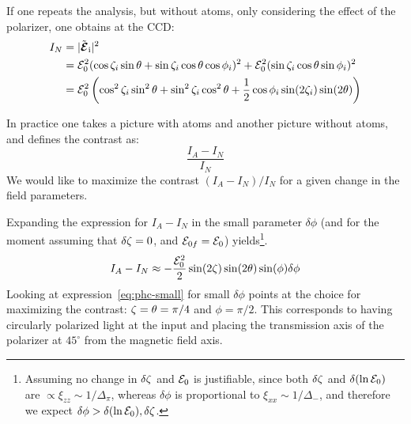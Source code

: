 If one repeats the analysis, but without atoms, only considering the effect of
the polarizer, one obtains at the CCD:
\begin{equation}
\begin{split}
  I_{N}  & = | \tilde{\bm{\mathcal{E}}}_{\text{i} } |^{2}  \\
    & = \mathcal{E}_{0}^{2}
        ( \cos\zeta_{i} \sin\theta + \sin\zeta_{i} \cos\theta \cos\phi_{i} )^{2}
      +  \mathcal{E}_{0}^{2}(\sin\zeta_{i} \cos\theta \sin\phi_{i} )^{2} \\  
    & = \mathcal{E}_{0}^{2} 
       \left( \cos^{2}\zeta_{i} \sin^{2}\theta +  
              \sin^{2}\zeta_{i} \cos^{2}\theta +
         \frac{1}{2} \cos\phi_{i}
                     \sin(2\zeta_{i}) \sin(2\theta) \right)
\end{split}
\end{equation}

In practice one takes a picture with atoms and another picture without atoms, 
and defines the contrast as:
\begin{equation} 
 \frac{ I_{A} - I_{N} }{I_{N}} 
\end{equation} 
We would like to maximize the contrast $(I_{A} - I_{N})/I_{N}$ for a given
change in the field parameters.   

Expanding the expression for $I_{A}-I_{N}$ in the small parameter $\delta\phi$
(and for the moment assuming that $\delta\zeta = 0$, and
$\mathcal{E}_{0f}=\mathcal{E}_{0}$) yields\footnote{Assuming no change in
$\delta\zeta$ and $\mathcal{E}_{0}$ is  justifiable, since both $\delta\zeta$ and
$\delta( \ln\mathcal{E}_{0})$ are $\propto \xi_{zz} \sim 1/\Delta_{\pi}$, whereas
$\delta\phi$ is proportional to $\xi_{xx} \sim 1/\Delta_{-}$, and therefore we
expect $\delta\phi > \delta(\ln\mathcal{E}_{0}), \delta\zeta$.  }.
\begin{equation} I_{A} - I_{N} \approx -
\frac{\mathcal{E}_{0}^{2}}{2} \sin( 2\zeta) \sin( 2\theta ) \sin(\phi)	\delta \phi
\label{eq:phc-small}
\end{equation} 
Looking at expression~\ref{eq:phc-small} for small $\delta\phi$ points at the
choice for maximizing the contrast: $\zeta=\theta = \pi/4$ and
$\phi=\pi/2$.   This corresponds to having circularly polarized light at the
input and placing the transmission axis of the polarizer at $45^{\circ}$ from
the magnetic field axis.  


